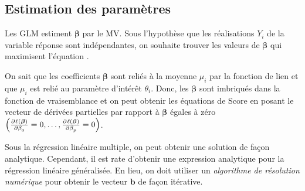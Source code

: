 \documentclass[french]{article}
\begin{document}
\begin{multicols*}{2}



\columnbreak
\subsection{Estimation des paramètres}
\begin{rappel_enhanced}[Contexte]
Les GLM estiment $\bm{\beta}$ par le MV. Sous l'hypothèse que les réalisations $Y_{i}$ de la variable réponse sont indépendantes, on souhaite trouver les valeurs de $\bm{\beta}$ qui maximisent l'équation .

\bigskip

On sait que les coefficients $\bm{\beta}$ sont reliés à la moyenne $\mu_{i}$ par la fonction de lien et que $\mu_{i}$ est relié au paramètre d'intérêt $\theta_{i}$. Donc, les $\bm{\beta}$ sont imbriqués dans la fonction de vraisemblance et on peut obtenir les équations de Score en posant le vecteur de dérivées partielles par rapport à $\bm{\beta}$ égales à zéro $\left(\deriv{\beta_{0}}{\ell(\bm{\beta})} = 0, \dots, \deriv{\beta_{p}}{\ell(\bm{\beta})} = 0\right)$.

\bigskip

Sous la régression linéaire multiple, on peut obtenir une solution de façon analytique. Cependant, il est rate d'obtenir une expression analytique pour la régression linéaire généralisée. En lieu, on doit utiliser un \textit{algorithme de résolution numérique} pour obtenir le vecteur $\bm{b}$ de façon itérative.
\end{rappel_enhanced}


\end{multicols*}
\end{document}
